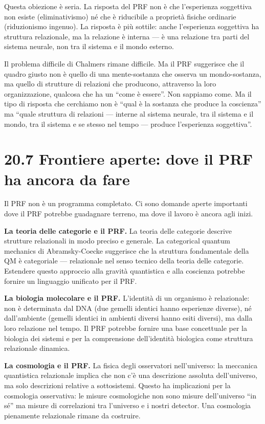 \documentclass[11.5pt,a4paper,openany]{book}
\theoremstyle{remark}
\begin{document}
Questa obiezione è seria. La risposta del PRF non è che l'esperienza soggettiva non esiste (eliminativismo) né che è riducibile a proprietà fisiche ordinarie (riduzionismo ingenuo). La risposta è più sottile: anche l'esperienza soggettiva ha struttura relazionale, ma la relazione è interna --- è una relazione tra parti del sistema neurale, non tra il sistema e il mondo esterno.

Il problema difficile di Chalmers rimane difficile. Ma il PRF suggerisce che il quadro giusto non è quello di una mente-sostanza che osserva un mondo-sostanza, ma quello di strutture di relazioni che producono, attraverso la loro organizzazione, qualcosa che ha un ``come è essere''. Non sappiamo come. Ma il tipo di risposta che cerchiamo non è ``qual è la sostanza che produce la coscienza'' ma ``quale struttura di relazioni --- interne al sistema neurale, tra il sistema e il mondo, tra il sistema e se stesso nel tempo --- produce l'esperienza soggettiva''.

\section{20.7 Frontiere aperte: dove il PRF ha ancora da fare}

Il PRF non è un programma completato. Ci sono domande aperte importanti dove il PRF potrebbe guadagnare terreno, ma dove il lavoro è ancora agli inizi.

\textbf{La teoria delle categorie e il PRF.} La teoria delle categorie descrive strutture relazionali in modo preciso e generale. La categorical quantum mechanics di Abramsky-Coecke suggerisce che la struttura fondamentale della QM è categoriale --- relazionale nel senso tecnico della teoria delle categorie. Estendere questo approccio alla gravità quantistica e alla coscienza potrebbe fornire un linguaggio unificato per il PRF.

\textbf{La biologia molecolare e il PRF.} L'identità di un organismo è relazionale: non è determinata dal DNA (due gemelli identici hanno esperienze diverse), né dall'ambiente (gemelli identici in ambienti diversi hanno esiti diversi), ma dalla loro relazione nel tempo. Il PRF potrebbe fornire una base concettuale per la biologia dei sistemi e per la comprensione dell'identità biologica come struttura relazionale dinamica.

\textbf{La cosmologia e il PRF.} La fisica degli osservatori nell'universo: la meccanica quantistica relazionale implica che non c'è una descrizione assoluta dell'universo, ma solo descrizioni relative a sottosistemi. Questo ha implicazioni per la cosmologia osservativa: le misure cosmologiche non sono misure dell'universo ``in sé'' ma misure di correlazioni tra l'universo e i nostri detector. Una cosmologia pienamente relazionale rimane da costruire.
\end{document}
